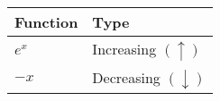 \documentclass[11pt, a4paper]{article}
\begin{document}
\pagebreak
\begin{table}[!htbp]
\def\arraystretch{2.5}
\begin{center}
\begin{tabular}{|>{\centering}m{4cm}||>{\centering\arraybackslash}m{4cm}|}

\hline
\textbf{Function} & \textbf{Type} \\
\hline
\hline
$ e^x $ & Increasing $(\uparrow)$\\
\hline

$ -x $ & Decreasing $ (\downarrow)$\\
\hline
\end{tabular}
\end{center}

\end{table}
\end{document}
